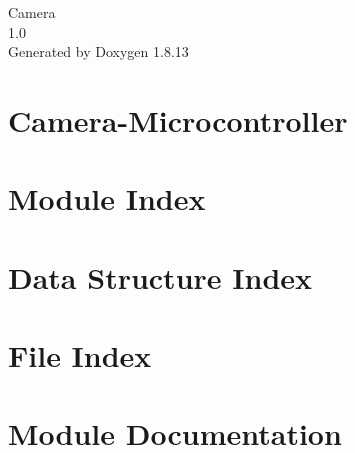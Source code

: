 \documentclass[twoside]{book}
\newcommand{\+}{\discretionary{\mbox{\scriptsize$\hookleftarrow$}}{}{}}
\newcommand{\clearemptydoublepage}{%
  \newpage{\pagestyle{empty}\cleardoublepage}%
}
\begin{document}
\hypersetup{pageanchor=false,
             bookmarksnumbered=true,
             pdfencoding=unicode
            }
\begin{titlepage}
\vspace*{7cm}
\begin{center}%
{\Large Camera \\[1ex]\large 1.\+0 }\\
\vspace*{1cm}
{\large Generated by Doxygen 1.8.13}\\
\end{center}
\end{titlepage}
\clearemptydoublepage
{}
\tableofcontents
\clearemptydoublepage
{}
\hypersetup{pageanchor=true}

\chapter{Camera-\/\+Microcontroller}
\label{md__c_1__users__james__documents__camera-_microcontroller__r_e_a_d_m_e}

\chapter{Module Index}

\chapter{Data Structure Index}

\chapter{File Index}

\chapter{Module Documentation}





















\end{document}
